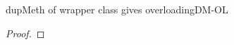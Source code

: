 \documentclass[acmlarge, anonymous, authordraft, review]{acmart} %
\begin{document}
    
\begin{lemma}{dupMeth of wrapper class gives overloading}{DM-OL}

  \begin{conds}
   \cond{\fresh{\that}}
  \end{conds}
  
  \then{}

   \begin{proof} 
%      
% 
% 
   \end{proof}
\end{lemma}
\end{document}
